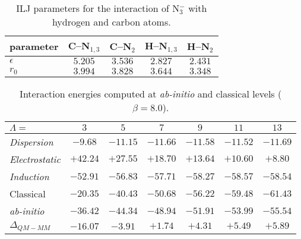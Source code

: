 \def\btab#1#2{\expandafter\gdef\csname tab-#1\endcsname{\begin{table}[ht]#2\label{#1}\end{table}}}
\def\tref#1{\csname tab-#1\endcsname\Cref{#1}}

\btab{tab:ILJ_parms}{
    \centering
    \begin{tabular}{l cccc}
        \toprule
        parameter   & C--N$_{1,3}$  & C--N$_2$  & H--N$_{1,3}$  & H--N$_2$ \\
        \midrule
        $\epsilon$  & $5.205$       & $3.536$   & $2.827$       & $2.431$  \\
        $r_0$       & $3.994$       & $3.828$   & $3.644$       & $3.348$  \\
        \bottomrule
    \end{tabular}
    \caption{ILJ parameters for the interaction of N$_3^-$ with hydrogen and carbon atoms.}
}

\btab{tab:pot_comp}{
    \centering
    \begin{tabular}{l cccccc}
        \toprule
        $\Lambda =$            & $3$      & $5$      & $7$      & $9$      & $11$     & $13$     \\
        \midrule
        \textit{Dispersion}    & $-9.68$  & $-11.15$ & $-11.66$ & $-11.58$ & $-11.52$ & $-11.69$ \\
        \textit{Electrostatic} & $+42.24$ & $+27.55$ & $+18.70$ & $+13.64$ & $+10.60$ & $+8.80$  \\
        \textit{Induction}     & $-52.91$ & $-56.83$ & $-57.71$ & $-58.27$ & $-58.57$ & $-58.54$ \\
        \midrule
        Classical              & $-20.35$ & $-40.43$ & $-50.68$ & $-56.22$ & $-59.48$ & $-61.43$ \\
        \emph{ab-initio}       & $-36.42$ & $-44.34$ & $-48.94$ & $-51.91$ & $-53.99$ & $-55.54$ \\
        \midrule
        $\Delta_{QM-MM}$       & $-16.07$ & $-3.91$  & $+1.74$  & $+4.31$  & $+5.49$  & $+5.89$  \\
        \bottomrule
    \end{tabular}
    \caption{Interaction energies computed at \emph{ab-initio} and classical levels ($\beta = 8.0$).}
}


